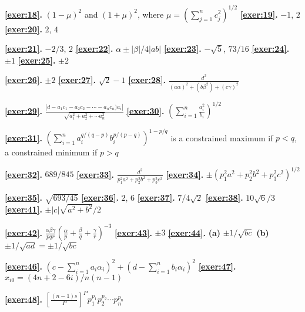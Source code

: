 \documentclass{article}
\newcommand{\dst}{\displaystyle}
\begin{document}
\quad

{\bf \ref{exer:18}.}
$(1-\mu)^{2}$ and  $(1+\mu)^{2}$, where
$\mu =\dst{\left(\sum_{j=1}^{n}c_{j}^{2}\right)^{1/2}}$
\quad
{\bf \ref{exer:19}.} $-1$, $2$
\quad
{\bf \ref{exer:20}.} $2$, $4$

\medskip
{\bf \ref{exer:21}.} $-2/3$, $2$
\quad
{\bf \ref{exer:22}.} $\alpha\pm|\beta|/4|ab|$
\quad
{\bf \ref{exer:23}.} $-\sqrt{5}$, $73/16$
\quad
{\bf \ref{exer:24}.}  $\pm1$
\quad
{\bf \ref{exer:25}.}   $\pm2$

\medskip
{\bf \ref{exer:26}.}   $\pm2$
\quad
{\bf \ref{exer:27}.}  $\sqrt2-1$
\quad
{\bf \ref{exer:28}.}
$\dst{\frac{d^{2}}{(a\alpha)^{2}+(b\beta^{2})+(c\gamma)^{2}}}$

\medskip
{\bf \ref{exer:29}.}
$\dst{\frac{|d-a_{1}c_{1}-a_{2}c_{2}-\cdots-a_{n}c_{n})a_{i}|}
{\sqrt{a_{1}^{2}+a_{2}^{2}+\cdots a_{n}^{2}}}}$
\quad
{\bf \ref{exer:30}.}
$\dst{\left(\sum_{i=1}^{n}\frac{a_{i}^{2}}{b_{i}}\right)^{1/2}}$


{\bf \ref{exer:31}.}
$\dst{\left(\sum_{i=1}^{n}a_{i}^{q/(q-p)} b_{i}^{p/(p-q)}\right)^{1-p/q}}$
is a constrained maximum if $p<q$, a constrained minimum if $p>q$

\medskip
{\bf \ref{exer:32}.} $689/845$
\quad
{\bf \ref{exer:33}.}
$\dst{\frac{d^{2}}{p_{1}^{2}a^{2}+p_{2}^{2}b^{2}+p_{3}^{2}c^{2}}}$
\quad
{\bf \ref{exer:34}.} $\pm (p_{1}^{2}a^{2}+p_{2}^{2}b^{2}+p_{3}^{2}c^{2})^{1/2}$
\quad


\medskip

{\bf \ref{exer:35}.}
\quad
$\sqrt{693/45}$
{\bf \ref{exer:36}.}  $2$, $6$
\quad
{\bf \ref{exer:37}.} $7/4\sqrt{2}$
\quad
{\bf \ref{exer:38}.} $10\sqrt{6}/3$
\quad
{\bf \ref{exer:41}.}
$\pm|c|\sqrt{a^{2}+b^{2}}/2$

\medskip
{\bf \ref{exer:42}.}
$\dst{\frac{\alpha\beta\gamma}{pqr}
\left(\frac{\alpha}{p}+\frac{\beta}{q}+\frac{\gamma}{r}\right)^{-3}}$
{\bf \ref{exer:43}.}     $\pm3$
\quad
{\bf \ref{exer:44}.} {\bf (a)} $\pm1/\sqrt{bc}$
{\bf (b)} $\pm1/\sqrt{ad}=\pm1/\sqrt{bc}$

\medskip

{\bf \ref{exer:46}.}
$\dst{\left(c-\sum_{i=1}^{n}a_{i}\alpha_{i}\right)^{2}
+\left(d-\sum_{i=1}^{n}b_{i}\alpha_{i}\right)^{2}}$
\quad
{\bf \ref{exer:47}.} $x_{i0}=(4n+2-6i)/n(n-1)$

\medskip

{\bf \ref{exer:48}.}
$\left[\frac{(n-1)s}{P}\right]^{P}p_{1}^{p_{1}}p_{2}^{p_{2}}\cdots
p_{n}^{p_{n}}$

\medskip
\end{document}
